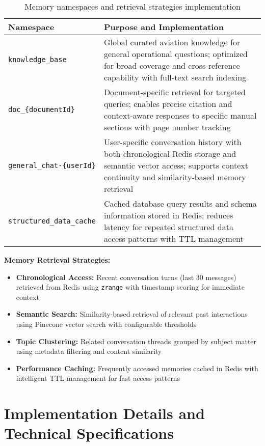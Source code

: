 \begin{table}[H]
\centering
\caption{Memory namespaces and retrieval strategies implementation}
\label{tab:namespaces_s2}
\begin{tabular}{|p{6cm}|p{10cm}|}
\hline
\textbf{Namespace} & \textbf{Purpose and Implementation} \\
\hline
\texttt{knowledge\_base} &
Global curated aviation knowledge for general operational questions; optimized for broad coverage and cross-reference capability with full-text search indexing \\
\hline
\texttt{doc\_\{documentId\}} &
Document-specific retrieval for targeted queries; enables precise citation and context-aware responses to specific manual sections with page number tracking \\
\hline
\texttt{general\_chat-\{userId\}} &
User-specific conversation history with both chronological Redis storage and semantic vector access; supports context continuity and similarity-based memory retrieval \\
\hline
\texttt{structured\_data\_cache} &
Cached database query results and schema information stored in Redis; reduces latency for repeated structured data access patterns with TTL management \\
\hline
\end{tabular}
\end{table}

\textbf{Memory Retrieval Strategies:}
\begin{itemize}
    \item \textbf{Chronological Access:} Recent conversation turns (last 30 messages) retrieved from Redis using \texttt{zrange} with timestamp scoring for immediate context
    \item \textbf{Semantic Search:} Similarity-based retrieval of relevant past interactions using Pinecone vector search with configurable thresholds
    \item \textbf{Topic Clustering:} Related conversation threads grouped by subject matter using metadata filtering and content similarity
    \item \textbf{Performance Caching:} Frequently accessed memories cached in Redis with intelligent TTL management for fast access patterns
\end{itemize}

\section{Implementation Details and Technical Specifications}
\label{sec:implementation_s2}

